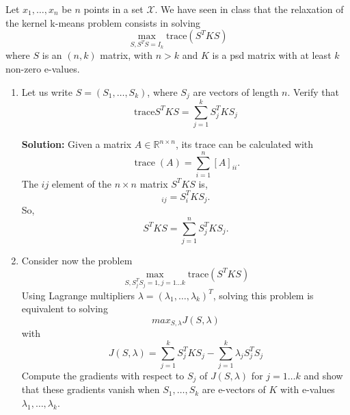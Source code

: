 \documentclass{article}[12pt]
\begin{document}
 Let $x_1,\ldots,x_n$ be $n$ points in a set $\mathcal{X}$. We have seen in class that the relaxation of the kernel k-means problem consists in solving 
 \begin{equation}
 \label{eq:kmeans}
 \max_{S,S^T S=I_k} \mbox{trace}\left(S^T K S\right)
 \end{equation}
 where $S$ is an $(n,k)$ matrix, with $n>k$ and $K$ is a psd matrix with at least $k$ non-zero e-values. 
 \begin{enumerate}
 \item Let us write $S=(S_1,\ldots,S_k)$, where $S_j$ are vectors of length $n$. 
 Verify that 
 \begin{equation}
 \mbox{trace}S^TKS = \sum_{j=1}^k S_j^T K S_j
 \end{equation}

 \textbf{Solution:} Given a matrix $A \in \mathbb R^{n \times n}$, its trace can be calculated with
 \begin{equation}
	 \operatorname{trace}(A) = \sum^{n}_{i=1} [A]_{ii}. 
 \end{equation}
 The $ij$ element of the $n\times n$ matrix $S^T KS$ is,
 \begin{equation}
	 [S^T K S]_{ij} = S_i^T K S_j.
 \end{equation}
 So,
 \begin{equation}
	 {S^T K S}= \sum^{n}_{j=1} S_j^T K S_j. 
 \end{equation}

\item  Consider now the problem 
 \begin{equation}
 \label{eq:2}
 \max_{S,S_j^TS_j=1,j=1\ldots k} \mbox{trace}\left(S^TKS\right)
 \end{equation}
 Using Lagrange multipliers $\lambda=(\lambda_1,\ldots,\lambda_k)^T$, solving this problem is equivalent to solving 
 \begin{equation}
 max_{S,\lambda} J(S,\lambda) 
 \end{equation}
 with 
 \begin{equation}
 J(S,\lambda) =  \sum_{j=1}^k S_j^T K S_j - \sum_{j=1}^k \lambda_j S_j^TS_j
 \end{equation}
  Compute the gradients with respect to $S_j$ of $J(S,\lambda)$ for $j=1\ldots k$ and show that these gradients vanish when $S_1,\ldots,S_k$ are e-vectors of $K$ with e-values $\lambda_1,\ldots,\lambda_k$. 


\end{enumerate}
\end{document}

